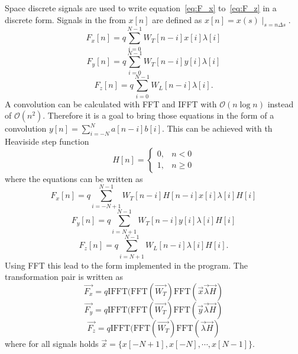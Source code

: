 \documentclass[11pt,a4paper]{article}
\begin{document}
Space discrete signals are used to write equation~\eqref{eq:F_x} to~\eqref{eq:F_z} in a discrete form. Signals in the from $x[n]$ are defined as $x[n] = x(s)\mid_{s=n\Delta s}$.
\begin{equation} \label{eq:F_x_disc}
F_x[n] = q\sum_{i=0}^{N-1} W_T[n-i]x[i]\lambda[i]
\end{equation}
\begin{equation}
F_y[n] = q\sum_{i=0}^{N-1} W_T[n-i]y[i]\lambda[i]
\end{equation}
\begin{equation}
F_z[n] = q\sum_{i=0}^{N-1} W_L[n-i]\lambda[i].
\end{equation}
A convolution can be calculated with FFT and IFFT with $\mathcal{O}(n \log n)$ instead of $\mathcal{O}(n^2)$. Therefore it is a goal to bring those equations in the form of a convolution $y[n] = \sum_{i=-N}^{N} a[n-i]b[i]$.
This can be achieved with th Heaviside step function \begin{equation} H[n]=\begin{cases}
  0,  & n<0\\
  1, & n\geq 0
\end{cases}\end{equation}
where the equations can be written as
\begin{equation}
F_x[n] = q\sum_{i=-N+1}^{N-1} W_T[n-i]H[n-i]x[i]\lambda[i] H[i]
\end{equation}
\begin{equation}
F_y[n] = q\sum_{i=N+1}^{N-1} W_T[n-i]y[i]\lambda[i] H[i]
\end{equation}
\begin{equation}
F_z[n] = q\sum_{i=N+1}^{N-1} W_L[n-i]\lambda[i]H[i].
\end{equation}
Using FFT this lead to the form implemented in the program. The transformation pair is written as
\begin{equation}
\vec{F_x} = q\text{IFFT}(\text{FFT} (\vec{W_T}) \text{FFT}(\vec{x}\vec{\lambda}\vec{H})
\end{equation}
\begin{equation}
\vec{F_y} = q\text{IFFT}(\text{FFT} (\vec{W_T}) \text{FFT}(\vec{y}\vec{\lambda}\vec{H})
\end{equation}
\begin{equation}
\vec{F_z} = q\text{IFFT}(\text{FFT} (\vec{W_T}) \text{FFT}(\vec{\lambda}\vec{H})
\end{equation}
where for all signals holds $\vec{x} = \{x[-N+1], x[-N] ,\cdots , x[N-1]\}$.
\end{document}
